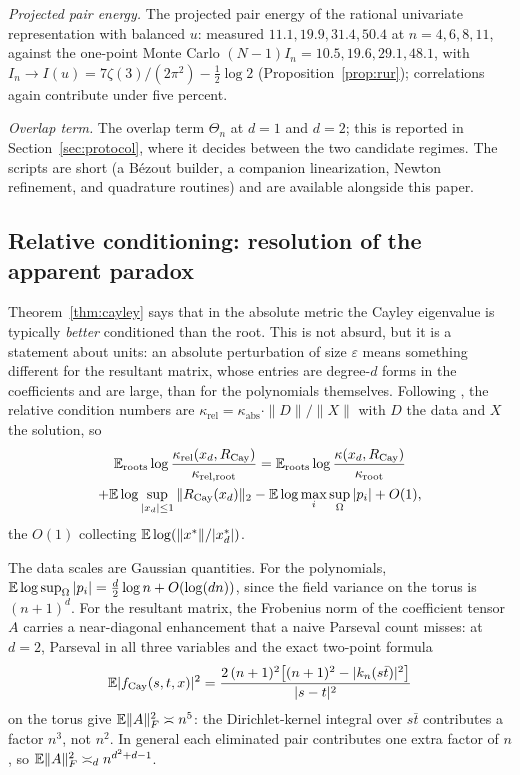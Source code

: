 \emph{Projected pair energy.} The projected pair energy of the rational univariate
representation with balanced $u$: measured $11.1, 19.9, 31.4, 50.4$ at $n=4,6,8,11$,
against the one-point Monte Carlo $(N-1)I_n = 10.5, 19.6, 29.1, 48.1$, with
$I_n\to I(u) = 7\zeta(3)/(2\pi^2) - \frac12\log2$ (Proposition~\ref{prop:rur});
correlations again contribute under five percent.

\emph{Overlap term.} The overlap term $\Theta_n$ at $d=1$ and $d=2$; this is reported in
Section~\ref{sec:protocol}, where it decides between the two candidate regimes. The
scripts are short (a B\'ezout builder, a companion linearization, Newton refinement, and
quadrature routines) and are available alongside this paper.

\subsection{Relative conditioning: resolution of the apparent paradox}
\label{sec:relativeCayley}

Theorem~\ref{thm:cayley} says that in the absolute metric the Cayley eigenvalue is
typically \emph{better} conditioned than the root. This is not absurd, but it is a
statement about units: an absolute perturbation of size $\varepsilon$ means something
different for the resultant matrix, whose entries are degree-$d$ forms in the coefficients
and are large, than for the polynomials themselves. Following
\cite[Sec.~5]{noferini2016numerical}, the relative condition numbers are
$\kappa_{\mathrm{rel}} = \kappa_{\mathrm{abs}}\cdot\|D\|/\|X\|$ with $D$ the data and $X$
the solution, so
\begin{multline*}
  \mathbb{E}_{\mathrm{roots}}\log\frac{\kappa_{\mathrm{rel}}(x_d,R_{\mathrm{Cay}})}{\kappa_{\mathrm{rel,root}}}
  = \mathbb{E}_{\mathrm{roots}}\log\frac{\kappa(x_d,R_{\mathrm{Cay}})}{\kappa_{\mathrm{root}}} \\
  + \mathbb{E}\log\sup_{|x_d|\le1}\|R_{\mathrm{Cay}}(x_d)\|_2
  - \mathbb{E}\log\max_i\sup_\Omega|p_i| + O(1),
\end{multline*}
the $O(1)$ collecting $\mathbb{E}\log(\|x^*\|/|x_d^*|)$.

The data scales are Gaussian quantities. For the polynomials,
$\mathbb{E}\log\sup_\Omega|p_i| = \frac d2\log n + O(\log(dn))$, since the field variance on the
torus is $(n+1)^d$. For the resultant matrix, the Frobenius norm of the coefficient tensor
$A$ carries a near-diagonal enhancement that a naive Parseval count misses: at $d=2$,
Parseval in all three variables and the exact two-point formula
\[
  \mathbb{E}|f_{\mathrm{Cay}}(s,t,x)|^2
  = \frac{2\,(n+1)^2\bigl[(n+1)^2 - |k_n(s\bar t)|^2\bigr]}{|s-t|^2}
\]
on the torus give $\mathbb{E}\|A\|_F^2\asymp n^5$: the Dirichlet-kernel integral over $s\bar t$
contributes a factor $n^3$, not $n^2$. In general each eliminated pair contributes one
extra factor of $n$, so $\mathbb{E}\|A\|_F^2\asymp_dn^{d^2+d-1}$.

